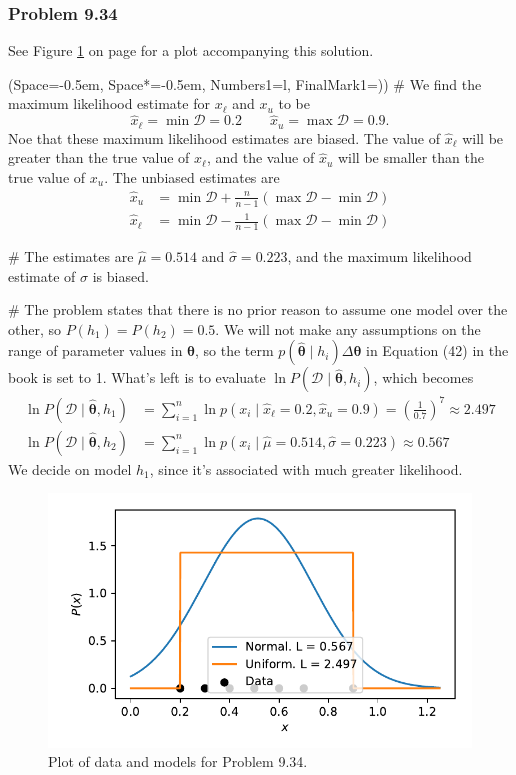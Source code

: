 \documentclass[12pt, a4paper]{article}
\newcommand{\listSpace}{-0.5em}%
\newcommand{\D}{\mathcal{D}}
\newcommand{\vect}[1]{\bm{#1}}
\begin{document}
{\subsubsection*{Problem 9.34}
See Figure \ref{fig:duda_ch9_prob34} on page \pageref{fig:duda_ch9_prob34} for a plot accompanying this solution.
\begin{easylist}[enumerate]
	\ListProperties(Space=\listSpace, Space*=\listSpace, Numbers1=l, FinalMark1={)})
	# We find the maximum likelihood estimate for $x_\ell$ and $x_u$ to be
	\begin{equation*}
		\hat{x}_\ell = \min \D = 0.2 \qquad 
		\hat{x}_u = \max \D = 0.9.
	\end{equation*}
	Noe that these maximum likelihood estimates are biased.
	The value of $\hat{x}_\ell$ will be greater than the true value of $x_\ell$, and the value of $\hat{x}_u$ will be smaller than the true value of $x_u$.
	The unbiased estimates are
	\begin{align*}
		\hat{x}_u &= \min \D + \frac{n}{n-1} \left( \max \D - \min \D \right) \\
		\hat{x}_\ell &= \min \D - \frac{1}{n-1} \left( \max \D - \min \D \right)
	\end{align*}
	
	# The estimates are $\hat{\mu} = 0.514$ and $\hat{\sigma} = 0.223$, and the maximum likelihood estimate of $\sigma$ is biased.
	
	# The problem states that there is no prior reason to assume one model over the other, so $P(h_1) = P(h_2) = 0.5$.
	We will not make any assumptions on the range of parameter values in $\vect{\theta}$, so the term $p(\hat{\vect{\theta}} \mid h_i) \Delta \vect{\theta}$ in Equation (42) in the book is set to 1.
	What's left is to evaluate $\ln P(\D \mid \hat{\vect{\theta}}, h_i)$, which becomes
	\begin{align*}
		\ln P(\D \mid \hat{\vect{\theta}}, h_1) &= 
		\sum_{i=1}^{n} \ln p(x_i \mid  \hat{x}_\ell = 0.2, \hat{x}_u = 0.9) = \left(\frac{1}{0.7}\right)^{7} \approx 2.497 \\
		\ln P(\D \mid \hat{\vect{\theta}}, h_2) &= 
		\sum_{i=1}^{n} \ln p(x_i \mid  \hat{\mu} = 0.514, \hat{\sigma} = 0.223) \approx 0.567
	\end{align*}
	We decide on model $h_1$, since it's associated with much greater likelihood.
\end{easylist}
	
\begin{figure}[ht!]
\centering
\includegraphics[width=0.65\linewidth]{figs/duda_ch9_prob34}
\caption{Plot of data and models for Problem 9.34.}
\label{fig:duda_ch9_prob34}
\end{figure}


}
\end{document}

